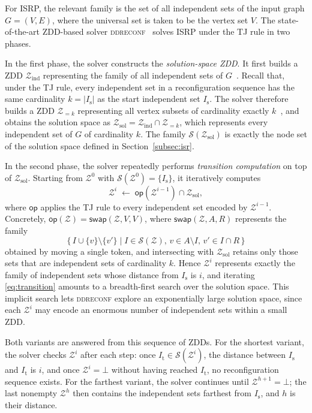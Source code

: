 \documentclass[conference]{IEEEtran}
\newcommand{\ini}{\mathrm{s}}
\newcommand{\tar}{\mathrm{t}}
\newcommand{\Z}{\mathcal{Z}}
\newcommand{\sets}{\mathcal{S}}
\newcommand{\zind}{\mathcal{Z}_{\mathrm{ind}}}
\newcommand{\zsol}{\mathcal{Z}_{\mathrm{sol}}}
\newcommand{\swap}{\mathsf{swap}}
\begin{document}
For ISRP, the relevant family is the set of all independent sets of the input
graph $G = (V, E)$, where the universal set is taken to be the vertex set $V$.
The state-of-the-art ZDD-based solver \textsc{ddreconf}~\cite{ItoKNSSTT23} solves
ISRP under the TJ rule in two phases.

In the first phase, the solver constructs the \emph{solution-space ZDD}.
It first builds a ZDD $\zind$ representing the family of all independent sets of
$G$~\cite{Hayase1995}. Recall that, under the TJ rule, every independent set in a
reconfiguration sequence has the same cardinality $k = |I_\ini|$ as the start
independent set $I_\ini$. The solver therefore builds a ZDD $\Z_{=k}$
representing all vertex subsets of cardinality exactly $k$~\cite{knuth:taocp41},
and obtains the solution space as $\zsol = \zind \cap \Z_{=k}$, which represents
every independent set of $G$ of cardinality $k$. The family $\sets(\zsol)$ is
exactly the node set of the solution space defined in
Section~\ref{subsec:isr}.

In the second phase, the solver repeatedly performs \emph{transition
computation} on top of $\zsol$. Starting from $\Z^{0}$ with
$\sets(\Z^{0}) = \{I_\ini\}$, it iteratively computes
\begin{equation}
  \Z^{i} \;\gets\; \mathsf{op}(\Z^{i-1}) \cap \zsol,
  \label{eq:transition}
\end{equation}
where $\mathsf{op}$ applies the TJ rule to every independent set encoded by
$\Z^{i-1}$. Concretely, $\mathsf{op}(\Z) = \swap(\Z, V, V)$, where
$\swap(\Z, A, R)$ represents the family
\[
  \{\, I \cup \{v\} \setminus \{v'\} \mid I \in \sets(\Z),\,
  v \in A \setminus I,\, v' \in I \cap R \,\}
\]
obtained by moving a single token, and intersecting with $\zsol$ retains only
those sets that are independent sets of cardinality $k$. Hence $\Z^{i}$
represents exactly the family of independent sets whose distance from $I_\ini$ is
$i$, and iterating \eqref{eq:transition} amounts to a breadth-first search over
the solution space. This implicit search lets \textsc{ddreconf} explore an
exponentially large solution space, since each $\Z^{i}$ may encode an enormous
number of independent sets within a small ZDD.

Both variants are answered from this sequence of ZDDs. For the shortest variant,
the solver checks $\Z^{i}$ after each step: once $I_\tar \in \sets(\Z^{i})$, the
distance between $I_\ini$ and $I_\tar$ is $i$, and once $\Z^{i} = \bot$ without
having reached $I_\tar$, no reconfiguration sequence exists. For the farthest
variant, the solver continues until $\Z^{h+1} = \bot$; the last nonempty
$\Z^{h}$ then contains the independent sets farthest from $I_\ini$, and $h$ is
their distance.
\end{document}

